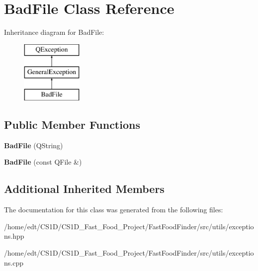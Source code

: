 \hypertarget{classBadFile}{\section{Bad\-File Class Reference}
\label{classBadFile}
}
Inheritance diagram for Bad\-File\-:\begin{figure}[H]
\begin{center}
\leavevmode
\includegraphics[height=3.000000cm]{classBadFile}
\end{center}
\end{figure}
\subsection*{Public Member Functions}
\begin{DoxyCompactItemize}
\item 
\hypertarget{classBadFile_aff3743219cfe8736a6a4f3630dc907d4}{{\bfseries Bad\-File} (Q\-String)}\label{classBadFile_aff3743219cfe8736a6a4f3630dc907d4}

\item 
\hypertarget{classBadFile_a3fd774c16c5808839343b60cf8d03a8b}{{\bfseries Bad\-File} (const Q\-File \&)}\label{classBadFile_a3fd774c16c5808839343b60cf8d03a8b}

\end{DoxyCompactItemize}
\subsection*{Additional Inherited Members}


The documentation for this class was generated from the following files\-:\begin{DoxyCompactItemize}
\item 
/home/edt/\-C\-S1\-D/\-C\-S1\-D\-\_\-\-Fast\-\_\-\-Food\-\_\-\-Project/\-Fast\-Food\-Finder/src/utils/exceptions.\-hpp\item 
/home/edt/\-C\-S1\-D/\-C\-S1\-D\-\_\-\-Fast\-\_\-\-Food\-\_\-\-Project/\-Fast\-Food\-Finder/src/utils/exceptions.\-cpp\end{DoxyCompactItemize}
